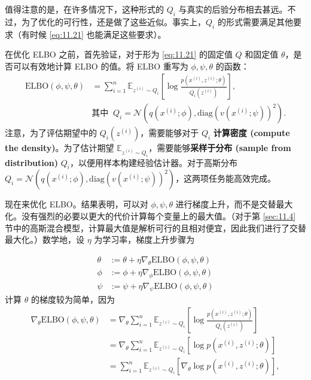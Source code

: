 值得注意的是，在许多情况下，这种形式的 $Q_i$ 与真实的后验分布相去甚远。不过，为了优化的可行性，还是做了这些近似。事实上，$Q_i$ 的形式需要满足其他要求（有时候 \eqref{eq:11.21} 也能满足这些要求）。

在优化 ELBO 之前，首先验证，对于形为 \eqref{eq:11.21} 的固定值 $Q$ 和固定值 $\theta$，是否可以有效地计算 ELBO 的值。将 ELBO 重写为 $\phi, \psi, \theta$ 的函数：
\begin{align}
    \text{ELBO}(\phi, \psi, \theta) 
    &= \sum_{i=1}^n \mathbb{E}_{z^{(i)} \sim Q_i} \left[ \log \frac{p(x^{(i)}, z^{(i)}; \theta)}{Q_i(z^{(i)})} \right], \label{eq:11.22}\\
    &\text{其中 } \  Q_i = \mathcal{N}(q(x^{(i)}; \phi), \text{diag}(v(x^{(i)}; \psi))^2). \nonumber
\end{align}
注意，为了评估期望中的 $Q_i(z^{(i)})$，需要能够对于 $Q_i$ \textbf{计算密度 (compute the density)}。为了估计期望 $\mathbb{E}_{z^{(i)} \sim Q_i}$，需要能够\textbf{采样于分布 (sample from distribution)} $Q_i$，以便用样本构建经验估计器。对于高斯分布 $Q_i = \mathcal{N}(q(x^{(i)}; \phi), \text{diag}(v(x^{(i)}; \psi))^2)$，这两项任务能高效完成。

现在来优化 ELBO。结果表明，可以对 $\phi, \psi, \theta$ 进行梯度上升，而不是交替最大化。没有强烈的必要以更大的代价计算每个变量上的最大值。（对于第 \ref{sec:11.4} 节中的高斯混合模型，计算最大值是解析可行的且相对便宜，因此我们进行了交替最大化。）数学地，设 $\eta$ 为学习率，梯度上升步骤为

\begin{align*}
    \theta &:= \theta + \eta \nabla_\theta \text{ELBO}(\phi, \psi, \theta) \\
    \phi &:= \phi + \eta \nabla_\phi \text{ELBO}(\phi, \psi, \theta) \\
    \psi &:= \psi + \eta \nabla_\psi \text{ELBO}(\phi, \psi, \theta)
\end{align*}
计算 $\theta$ 的梯度较为简单，因为
\begin{align}
    \nabla_\theta \text{ELBO}(\phi, \psi, \theta) 
    &= \nabla_\theta \sum_{i=1}^n \mathbb{E}_{z^{(i)} \sim Q_i} \left[ \log \frac{p(x^{(i)}, z^{(i)}; \theta)}{Q_i(z^{(i)})} \right] 
    \nonumber\\
    &= \nabla_\theta \sum_{i=1}^n \mathbb{E}_{z^{(i)} \sim Q_i} \left[ \log p(x^{(i)}, z^{(i)}; \theta) \right]
    \nonumber\\
    &= \sum_{i=1}^n \mathbb{E}_{z^{(i)} \sim Q_i} \left[ \nabla_\theta \log p(x^{(i)}, z^{(i)}; \theta) \right],\label{eq:11.23}
\end{align} 

